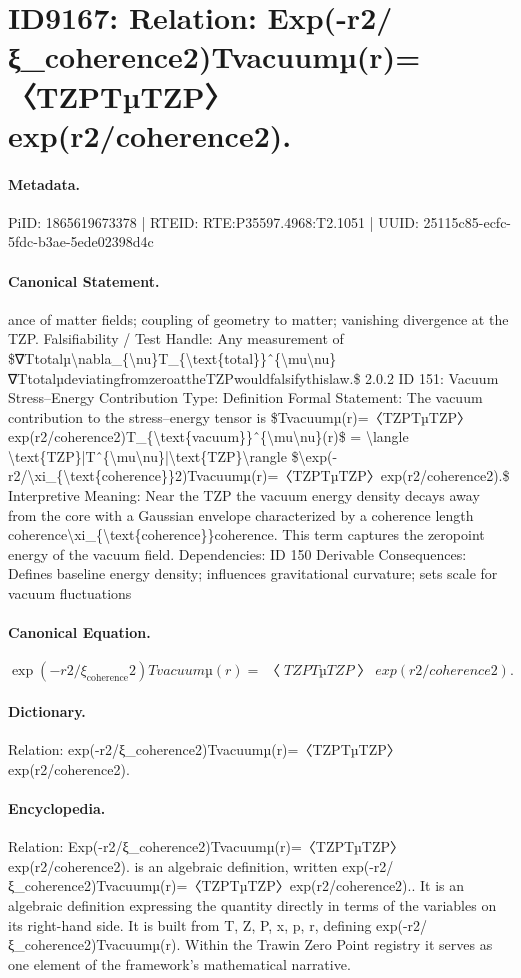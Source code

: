 \section*{ID9167: Relation: Exp(-r2/ξ\_coherence2)Tvacuumµ(r)=〈TZPTµTZP〉exp(r2/coherence2).}
\paragraph{Metadata.}
PiID: 1865619673378 | RTEID: RTE:P35597.4968:T2.1051 | UUID: 25115c85-ecfc-5fdc-b3ae-5ede02398d4c

\paragraph{Canonical Statement.}
ance of matter fields; coupling of geometry to matter; vanishing divergence at the TZP. Falsifiability / Test Handle: Any measurement of \$∇Ttotalµ\textbackslash{}nabla\_\{\textbackslash{}nu\}T\_\{\textbackslash{}text\{total\}\}ˆ\{\textbackslash{}mu\textbackslash{}nu\}∇TtotalµdeviatingfromzeroattheTZPwouldfalsifythislaw.\$ 2.0.2 ID 151: Vacuum Stress–Energy Contribution Type: Definition Formal Statement: The vacuum contribution to the stress–energy tensor is \$Tvacuumµ(r)=〈TZPTµTZP〉exp(r2/coherence2)T\_\{\textbackslash{}text\{vacuum\}\}ˆ\{\textbackslash{}mu\textbackslash{}nu\}(r)\$ = \textbackslash{}langle \textbackslash{}text\{TZP\}|Tˆ\{\textbackslash{}mu\textbackslash{}nu\}|\textbackslash{}text\{TZP\}\textbackslash{}rangle \$\textbackslash{}exp(-r2/\textbackslash{}xi\_\{\textbackslash{}text\{coherence\}\}2)Tvacuumµ(r)=〈TZPTµTZP〉exp(r2/coherence2).\$ Interpretive Meaning: Near the TZP the vacuum energy density decays away from the core with a Gaussian envelope characterized by a coherence length coherence\textbackslash{}xi\_\{\textbackslash{}text\{coherence\}\}coherence. This term captures the zeropoint energy of the vacuum field. Dependencies: ID 150 Derivable Consequences: Defines baseline energy density; influences gravitational curvature; sets scale for vacuum fluctuations

\paragraph{Canonical Equation.}
\[
\exp(-r2/\xi_{\text{coherence}}2)Tvacuumµ(r)=〈TZPTµTZP〉exp(r2/coherence2).
\]

\paragraph{Dictionary.}
Relation: exp(-r2/ξ\_coherence2)Tvacuumµ(r)=〈TZPTµTZP〉exp(r2/coherence2).

\paragraph{Encyclopedia.}
Relation: Exp(-r2/ξ\_coherence2)Tvacuumµ(r)=〈TZPTµTZP〉exp(r2/coherence2). is an algebraic definition, written exp(-r2/ξ\_coherence2)Tvacuumµ(r)=〈TZPTµTZP〉exp(r2/coherence2).. It is an algebraic definition expressing the quantity directly in terms of the variables on its right-hand side. It is built from T, Z, P, x, p, r, defining exp(-r2/ξ\_coherence2)Tvacuumµ(r). Within the Trawin Zero Point registry it serves as one element of the framework's mathematical narrative.
